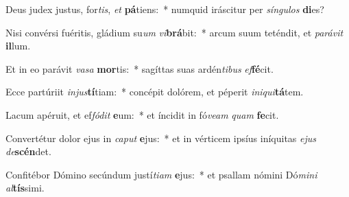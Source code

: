 \item Deus judex justus, for\textit{tis}, \textit{et} \textbf{pá}tiens:~* numquid iráscitur per \textit{sín}\textit{gu}\textit{los} \textbf{di}es?
\item Nisi convérsi fuéritis, gládium su\textit{um} \textit{vi}\textbf{brá}bit:~* arcum suum teténdit, et \textit{pa}\textit{rá}\textit{vit} \textbf{il}lum.
\item Et in eo parávit \textit{va}\textit{sa} \textbf{mor}tis:~* sagíttas suas ardén\textit{ti}\textit{bus} \textit{ef}\textbf{fé}cit.
\item Ecce partúriit \textit{in}\textit{jus}\textbf{tí}tiam:~* concépit dolórem, et péperit \textit{in}\textit{i}\textit{qui}\textbf{tá}tem.
\item Lacum apéruit, et ef\textit{fó}\textit{dit} \textbf{e}um:~* et íncidit in fó\textit{ve}\textit{am} \textit{quam} \textbf{fe}cit.
\item Convertétur dolor ejus in \textit{ca}\textit{put} \textbf{e}jus:~* et in vérticem ipsíus iníquitas \textit{e}\textit{jus} \textit{de}\textbf{scén}det.
\item Confitébor Dómino secúndum justí\textit{ti}\textit{am} \textbf{e}jus:~* et psallam nómini Dó\textit{mi}\textit{ni} \textit{al}\textbf{tís}simi.

